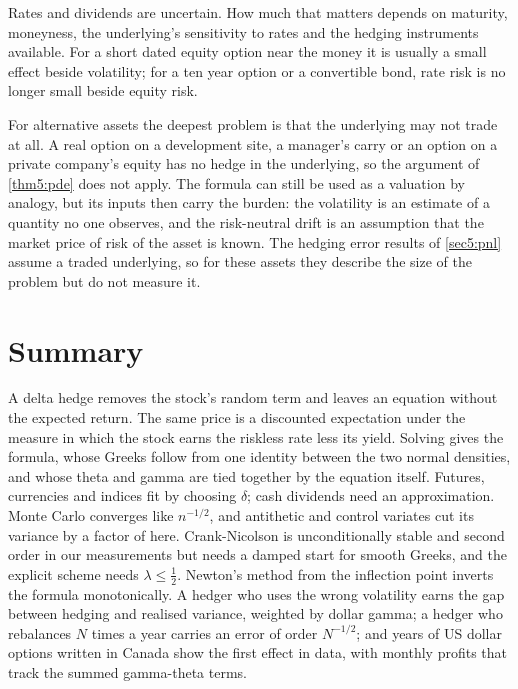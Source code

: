 \begin{chapterrefs}
Rates and dividends are uncertain. How much that matters depends on maturity, moneyness, the
underlying's sensitivity to rates and the hedging instruments available. For a short dated equity
option near the money it is usually a small effect beside volatility; for a ten year option or a
convertible bond, rate risk is no longer small beside equity risk.

For alternative assets the deepest problem is that the underlying may not trade at all. A real option
on a development site, a manager's carry or an option on a private company's equity has no hedge in the
underlying, so the argument of \cref{thm5:pde} does not apply. The formula can still be used as a
valuation by analogy, but its inputs then carry the burden: the volatility is an estimate of a
quantity no one observes, and the risk-neutral drift is an assumption that the market price of risk
of the asset is known. The hedging error results of \cref{sec5:pnl} assume a traded underlying, so
for these assets they describe the size of the problem but do not measure it.

\section{Summary}
\label{sec5:summary}

A delta hedge removes the stock's random term and leaves an equation without the expected return. The
same price is a discounted expectation under the measure in which the stock earns the riskless rate
less its yield. Solving gives the formula, whose Greeks follow from one identity between the two
normal densities, and whose theta and gamma are tied together by the equation itself. Futures,
currencies and indices fit by choosing $\delta$; cash dividends need an approximation. Monte Carlo
converges like $n^{-1/2}$, and antithetic and control variates cut its variance by a factor of
\vrMCBoth{} here. Crank-Nicolson is unconditionally stable and second order in our measurements but needs a damped start for
smooth Greeks, and the explicit scheme needs $\lambda\le\tfrac12$. Newton's method from the inflection
point inverts the formula monotonically. A hedger who uses the wrong volatility earns the gap between
hedging and realised variance, weighted by dollar gamma; a hedger who rebalances $N$ times a year
carries an error of order $N^{-1/2}$; and
\fxYears{} years of US dollar options written in Canada show the first effect in data, with monthly
profits that track the summed gamma-theta terms.


\end{chapterrefs}
